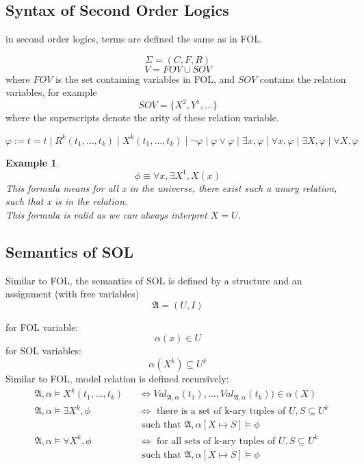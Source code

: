 \documentclass{article}
\newtheorem{example}[theorem]{Example}
\newtheorem{definition}[theorem]{Definition}
\let\olddefinition\definition
\let\endolddefinition\enddefinition
\renewenvironment{definition}
  {\begin{tcolorbox}[
      colback=red!10,
      colframe=red!50!black,
      boxrule=0.6pt,
      arc=2pt,
      left=6pt,right=6pt,top=4pt,bottom=4pt,
      breakable
    ]\olddefinition}
  {\endolddefinition\end{tcolorbox}}
\begin{document}
\subsection{Syntax of Second Order Logics}
in second order logics, terms are defined the same as in FOL. 

\[\Sigma = (C, F, R)\]
\[V = FOV \cup SOV\]
where $FOV$ is the set containing variables in FOL, and $SOV$ contains the relation variables, for example
\[SOV = \{X^2, Y^1, ...\}\]
where the superscripts denote the arity of these relation variable. 
\begin{definition}
\[\varphi := t = t \mid R^k(t_1, \dots, t_k) \mid X^k(t_1, \dots, t_k) \mid \neg \varphi \mid \varphi \lor \varphi \mid 
\exists x, \varphi \mid \forall x, \varphi \mid \exists X, \varphi \mid \forall X, \varphi\]    
\end{definition}
\begin{example}
    \[\phi \equiv \forall x, \exists X^1, X(x)\]
    This formula means for all x in the universe, there exist such a unary relation, such that x is in the relation. \\
    This formula is valid as we can always interpret $X = U$.
\end{example}

\subsection*{Semantics of SOL}
Similar to FOL, the semantics of SOL is defined by a structure and an assignment (with free variables)
\[\mathfrak{A} = (U, I)\]
\begin{definition}
    for FOL variable:
    \[\alpha(x) \in U\]
    for SOL variables:
    \[\alpha(X^k) \subseteq U^k\]
    Similar to FOL, model relation is defined recursively:
    \begin{align*}
        &\mathfrak{A}, \alpha \models X^k(t_1, \dots, t_k) &&\iff Val_{\mathfrak{A}, \alpha}(t_1), \dots, Val_{\mathfrak{A}, \alpha}(t_k)) \in \alpha(X)\\
        &\mathfrak{A}, \alpha \models \exists X^k, \phi &&\iff \text{ there is a set of k-ary tuples of } U, S\subseteq U^k\\
        &&&\text{ such that } \mathfrak{A}, \alpha[X \mapsto S] \models \phi\\
        &\mathfrak{A}, \alpha \models \forall X^k, \phi &&\iff \text{ for all sets of k-ary tuples of } U, S\subseteq U^k\\
        &&&\text{ such that } \mathfrak{A}, \alpha[X \mapsto S] \models \phi\\
    \end{align*}
\end{definition}
\end{document}
